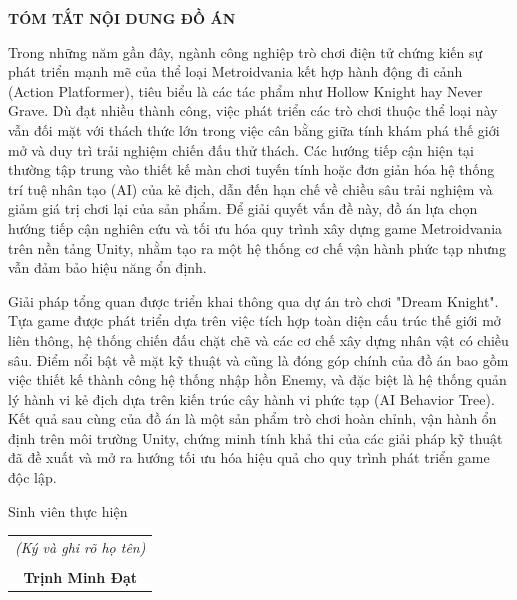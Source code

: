 \documentclass[../DoAn.tex]{subfiles}
\begin{document}
\begin{center}
    \Large{\textbf{TÓM TẮT NỘI DUNG ĐỒ ÁN}}\\
\end{center}
\vspace{1cm}

Trong những năm gần đây, ngành công nghiệp trò chơi điện tử chứng kiến sự phát triển mạnh mẽ của thể loại Metroidvania kết hợp hành động đi cảnh (Action Platformer), tiêu biểu là các tác phẩm như Hollow Knight hay Never Grave. Dù đạt nhiều thành công, việc phát triển các trò chơi thuộc thể loại này vẫn đối mặt với thách thức lớn trong việc cân bằng giữa tính khám phá thế giới mở và duy trì trải nghiệm chiến đấu thử thách. Các hướng tiếp cận hiện tại thường tập trung vào thiết kế màn chơi tuyến tính hoặc đơn giản hóa hệ thống trí tuệ nhân tạo (AI) của kẻ địch, dẫn đến hạn chế về chiều sâu trải nghiệm và giảm giá trị chơi lại của sản phẩm. Để giải quyết vấn đề này, đồ án lựa chọn hướng tiếp cận nghiên cứu và tối ưu hóa quy trình xây dựng game Metroidvania trên nền tảng Unity, nhằm tạo ra một hệ thống cơ chế vận hành phức tạp nhưng vẫn đảm bảo hiệu năng ổn định. 

Giải pháp tổng quan được triển khai thông qua dự án trò chơi "Dream Knight". Tựa game được phát triển dựa trên việc tích hợp toàn diện cấu trúc thế giới mở liên thông, hệ thống chiến đấu chặt chẽ và các cơ chế xây dựng nhân vật có chiều sâu. Điểm nổi bật về mặt kỹ thuật và cũng là đóng góp chính của đồ án bao gồm việc thiết kế thành công hệ thống nhập hồn Enemy, và đặc biệt là hệ thống quản lý hành vi kẻ địch dựa trên kiến trúc cây hành vi phức tạp (AI Behavior Tree). Kết quả sau cùng của đồ án là một sản phẩm trò chơi hoàn chỉnh, vận hành ổn định trên môi trường Unity, chứng minh tính khả thi của các giải pháp kỹ thuật đã đề xuất và mở ra hướng tối ưu hóa hiệu quả cho quy trình phát triển game độc lập.

\begin{flushright}
Sinh viên thực hiện\\
\vspace{1.5cm} %
\begin{tabular}{@{}c@{}}
\textit{(Ký và ghi rõ họ tên)}\\
\vspace{0.4cm}\\
\textbf{Trịnh Minh Đạt}
\end{tabular}
\end{flushright}
\end{document}
